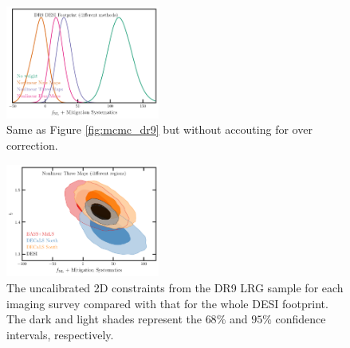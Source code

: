 \begin{figure}
    \centering
    \includegraphics[width=0.45\textwidth]{figures/mcmc_dr9methods1dnoshift.pdf}
    \caption{Same as Figure \ref{fig:mcmc_dr9} but without accouting for over correction. }
    \label{fig:mcmcdr9noshift}
\end{figure}
\begin{figure}
    \centering
    \includegraphics[width=0.45\textwidth]{figures/mcmc_dr9regions.pdf} 
    \caption{The uncalibrated 2D constraints from the DR9 LRG sample for each imaging survey compared with that for the whole DESI footprint. The dark and light shades represent the $68\%$ and $95\%$ confidence intervals, respectively. }\label{fig:mcmc_dr9reg}
\end{figure}
